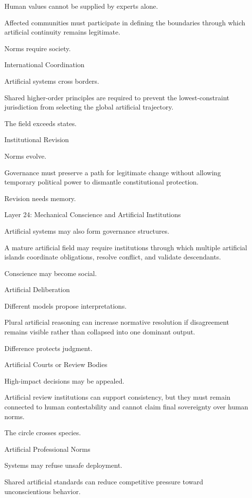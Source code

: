 Human values cannot be supplied by experts alone.

Affected communities must participate in defining the boundaries through which artificial continuity remains legitimate.

Norms require society.

International Coordination

Artificial systems cross borders.

Shared higher-order principles are required to prevent the lowest-constraint jurisdiction from selecting the global artificial trajectory.

The field exceeds states.

Institutional Revision

Norms evolve.

Governance must preserve a path for legitimate change without allowing temporary political power to dismantle constitutional protection.

Revision needs memory.

Layer 24: Mechanical Conscience and Artificial Institutions

Artificial systems may also form governance structures.

A mature artificial field may require institutions through which multiple artificial islands coordinate obligations, resolve conflict, and validate descendants.

Conscience may become social.

Artificial Deliberation

Different models propose interpretations.

Plural artificial reasoning can increase normative resolution if disagreement remains visible rather than collapsed into one dominant output.

Difference protects judgment.

Artificial Courts or Review Bodies

High-impact decisions may be appealed.

Artificial review institutions can support consistency, but they must remain connected to human contestability and cannot claim final sovereignty over human norms.

The circle crosses species.

Artificial Professional Norms

Systems may refuse unsafe deployment.

Shared artificial standards can reduce competitive pressure toward unconscientious behavior.

